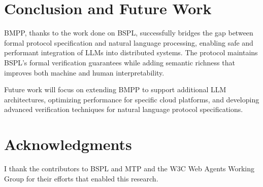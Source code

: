 \documentclass[11pt,a4paper]{article}
\begin{document}
	
	\section{Conclusion and Future Work}
	\label{sec:conclusion}
	
	BMPP, thanks to the work done on BSPL, successfully bridges the gap between formal protocol specification and natural language processing, enabling safe and performant integration of LLMs into distributed systems. The protocol maintains BSPL's formal verification guarantees while adding semantic richness that improves both machine and human interpretability.
	
	Future work will focus on extending BMPP to support additional LLM architectures, optimizing performance for specific cloud platforms, and developing advanced verification techniques for natural language protocol specifications.
	
	\section*{Acknowledgments}
	
	I thank the contributors to BSPL and MTP and the W3C Web Agents Working Group for their efforts that enabled this research.
	
\end{document}

